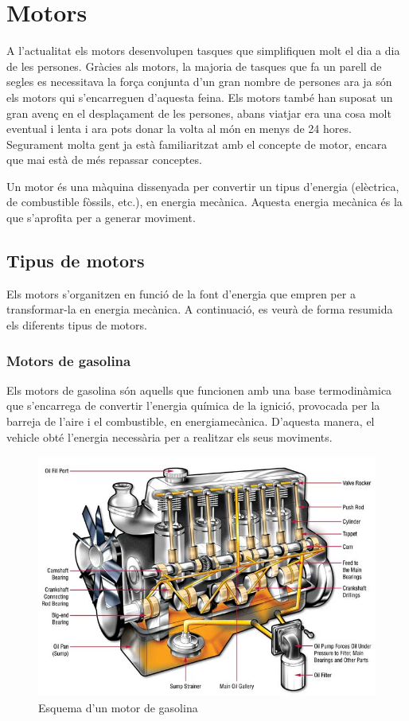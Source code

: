 \chapter{Motors}
\label{chap:motors}

A l’actualitat els motors desenvolupen tasques que simplifiquen molt el dia a dia de les persones. Gràcies als motors, la majoria de tasques que fa un parell de segles es necessitava la força conjunta d’un gran nombre de persones ara ja són els motors qui s’encarreguen d’aquesta feina. Els motors també han suposat un gran avenç en el desplaçament de les persones, abans viatjar era una cosa molt eventual i lenta i ara pots donar la volta al món en menys de 24 hores. Segurament molta gent ja està familiaritzat amb el concepte de motor, encara que mai està de més repassar conceptes.

Un motor és una màquina dissenyada per convertir un tipus d’energia (elèctrica, de combustible fòssils, etc.), en energia mecànica. Aquesta energia mecànica és la que s’aprofita per a generar moviment. 
     
\section{Tipus de motors}
Els motors s’organitzen en funció de la font d’energia que empren per a transformar-la en energia mecànica. A continuació, es veurà de forma resumida els diferents tipus de motors.

\subsection{Motors de gasolina}
Els motors de gasolina són aquells que funcionen amb una base \newline termodinàmica que s’encarrega de convertir l’energia química de la ignició, provocada per la barreja de l’aire i el combustible, en energia\newline mecànica. D’aquesta manera, el vehicle obté l’energia necessària per a realitzar els seus moviments.

\begin{figure}[H]
		\centering
    	\includegraphics[width=\textwidth, height=8cm]{Motors/motorgasolina.jpg}
     	\caption{Esquema d'un motor de gasolina} 
\end{figure}

